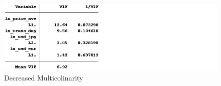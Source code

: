 \documentclass{article}[10 pt]
\begin{document}
\vspace{3mm}

\begin{figure}[ht!]

\centering

\includegraphics[width=125mm]{reg4_vif.png}

\caption{Decreased Multicolinarity}

\label{overflow}

\end{figure}

\vspace{3mm}
\end{document}
